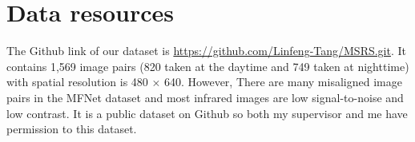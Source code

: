 \documentclass[a4paper,12pt]{article}
\begin{document}
\section{Data resources}
The Github link of our dataset is \url{https://github.com/Linfeng-Tang/MSRS.git}. It contains 1,569 image pairs (820 taken at the daytime and 749 taken at nighttime) with spatial resolution is 480 × 640. However, There are many misaligned image pairs in the MFNet dataset and most infrared images are low signal-to-noise and low contrast. It is a public dataset on Github so both my supervisor and me have permission to this dataset.
\end{document}
